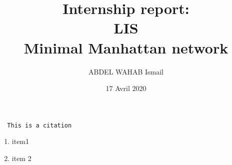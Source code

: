 \documentclass[11pt]{report}
\title{\textbf{Internship report: \\
			LIS\\  Minimal Manhattan network}}
\author{ABDEL WAHAB Ismail}
\date{17 Avril 2020}
\begin{document}
\maketitle
\thispagestyle{empty}
\renewcommand{\contentsname}{Summary}
\tableofcontents
\newpage

\iffalse --------------  Document Content-------------------------- \fi










\begin{quoting} \begin{verbatim}
  This is a citation
\end{verbatim} \end{quoting}

\begin{enumerate}
	\item{item1}
	\item{item 2}
\end{enumerate} 
\end{document}
